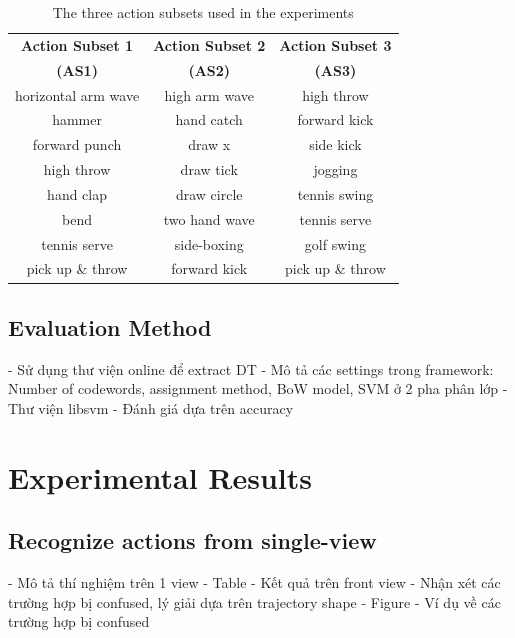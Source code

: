 \documentclass[review]{elsarticle}
\begin{document}
\begin{table}[H]
	\begin{center}
		\begin{tabular}{c|c|c}
		
		{\bf Action Subset 1} & {\bf Action Subset 2} & {\bf Action Subset 3} \\
		{\bf(AS1)} & {\bf(AS2)} & {\bf(AS3)} \\
		\hline
		horizontal arm wave &  high arm wave &     high throw \\
		
		        hammer &     hand catch &   forward kick \\
		
		 forward punch &         draw x &      side kick \\
		
		    high throw &      draw tick &        jogging \\
		
		     hand clap &    draw circle &   tennis swing \\
		
		          bend &  two hand wave &   tennis serve \\
		
		  tennis serve &    side-boxing &     golf swing \\
		
		pick up \& throw &   forward kick & pick up \& throw \\
		
		\end{tabular}
	\end{center}
	\caption{\label{lbl:3ActionSubsets}The three action subsets used in the experiments}
\end{table}

\subsection{Evaluation Method}
- Sử dụng thư viện online để extract DT
- Mô tả các settings trong framework: Number of codewords, assignment method, BoW model, SVM ở 2 pha phân lớp
- Thư viện libsvm
- Đánh giá dựa trên accuracy

\section{Experimental Results}

\subsection{Recognize actions from single-view}
- Mô tả thí nghiệm trên 1 view
- Table - Kết quả trên front view
- Nhận xét các trường hợp bị confused, lý giải dựa trên trajectory shape
- Figure - Ví dụ về các trường hợp bị confused
\end{document}

